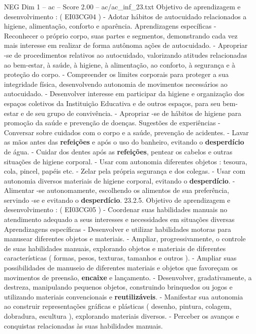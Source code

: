 \begin{textsample}{NEG Dim 1 – ac – Score 2.00 – ac/ac\_inf\_23.txt}
Objetivo de aprendizagem e desenvolvimento : ( EI03CG04 ) - Adotar hábitos de autocuidado relacionados a higiene, alimentação, conforto e aparência.
Aprendizagens específicas - Reconhecer o próprio corpo, suas partes e segmentos, demonstrando cada vez mais interesse em realizar de forma autônoma ações de autocuidado. - Apropriar -se de procedimentos relativos ao autocuidado, valorizando atitudes relacionadas ao bem-estar, à saúde, à higiene, à alimentação, ao conforto, à segurança e à proteção do corpo. - Compreender os limites corporais para proteger a sua integridade física, desenvolvendo autonomia de movimentos necessários ao autocuidado. - Desenvolver interesse em participar da higiene e organização dos espaços coletivos da Instituição Educativa e de outros espaços, para seu bem-estar e de seu grupo de convivência. - Apropriar -se de hábitos de higiene para promoção da saúde e prevenção de doenças.
Sugestões de experiências - Conversar sobre cuidados com o corpo e a saúde, prevenção de acidentes. - Lavar as mãos antes das \textbf{refeições} e após o uso do banheiro, evitando o \textbf{desperdício} de água. - Cuidar dos dentes após as \textbf{refeições}, pentear os cabelos e outras situações de higiene corporal. - Usar com autonomia diferentes objetos : tesoura, cola, pincel, papéis etc. - Zelar pela própria segurança e dos colegas. - Usar com autonomia diversos materiais de higiene corporal, evitando o \textbf{desperdício}. - Alimentar -se autonomamente, escolhendo os alimentos de sua preferência, servindo -se e evitando o \textbf{desperdício}. 23.2.5.
Objetivo de aprendizagem e desenvolvimento : ( EI03CG05 ) - Coordenar suas habilidades manuais no atendimento adequado a seus interesses e necessidades em situações diversas Aprendizagens específicas - Desenvolver e utilizar habilidades motoras para manusear diferentes objetos e materiais. - Ampliar, progressivamente, o controle de suas habilidades manuais, explorando objetos e materiais de diferentes características ( formas, pesos, texturas, tamanhos e outros ). - Ampliar suas possibilidades de manuseio de diferentes materiais e objetos que favoreçam os movimentos de preensão, \textbf{encaixe} e lançamento. - Desenvolver, gradativamente, a destreza, manipulando pequenos objetos, construindo brinquedos ou jogos e utilizando materiais convencionais e \textbf{reutilizáveis}. - Manifestar sua autonomia ao construir representações gráficas e plásticas ( desenho, pintura, colagem, dobradura, escultura ), explorando materiais diversos. - Perceber os avanços e conquistas relacionadas às suas habilidades manuais.

\end{textsample}
